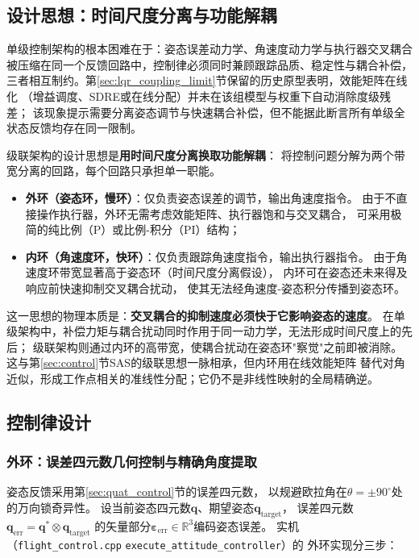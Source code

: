 \subsection{设计思想：时间尺度分离与功能解耦}
\label{sec:cascade_philosophy}

单级控制架构的根本困难在于：姿态误差动力学、角速度动力学与执行器交叉耦合
被压缩在同一个反馈回路中，控制律必须同时兼顾跟踪品质、稳定性与耦合补偿，
三者相互制约。第\ref{sec:lqr_coupling_limit}节保留的历史原型表明，效能矩阵在线化
（增益调度、SDRE或在线分配）并未在该组模型与权重下自动消除度级残差；
该现象提示需要分离姿态调节与快速耦合补偿，但不能据此断言所有单级全状态反馈均存在同一限制。

级联架构的设计思想是\textbf{用时间尺度分离换取功能解耦}：
将控制问题分解为两个带宽分离的回路，每个回路只承担单一职能。

\begin{itemize}
    \item \textbf{外环（姿态环，慢环）}：仅负责姿态误差的调节，输出角速度指令。
          由于不直接操作执行器，外环无需考虑效能矩阵、执行器饱和与交叉耦合，
          可采用极简的纯比例（P）或比例-积分（PI）结构；
    \item \textbf{内环（角速度环，快环）}：仅负责跟踪角速度指令，输出执行器指令。
          由于角速度环带宽显著高于姿态环（时间尺度分离假设），
          内环可在姿态还未来得及响应前快速抑制交叉耦合扰动，
          使其无法经角速度-姿态积分传播到姿态环。
\end{itemize}

这一思想的物理本质是：\textbf{交叉耦合的抑制速度必须快于它影响姿态的速度}。
在单级架构中，补偿力矩与耦合扰动同时作用于同一动力学，无法形成时间尺度上的先后；
级联架构则通过内环的高带宽，使耦合扰动在姿态环"察觉"之前即被消除。
这与第\ref{sec:control}节SAS的级联思想一脉相承，但内环用在线效能矩阵
替代对角近似，形成工作点相关的准线性分配；它仍不是非线性映射的全局精确逆。

\subsection{控制律设计}
\label{sec:cascade_design}

\subsubsection{外环：误差四元数几何控制与精确角度提取}

姿态反馈采用第\ref{sec:quat_control}节的误差四元数，
以规避欧拉角在$\theta=\pm90^\circ$处的万向锁奇异性。
设当前姿态四元数$\mathbf{q}$、期望姿态$\mathbf{q}_{\mathrm{target}}$，
误差四元数$\mathbf{q}_{\mathrm{err}}=\mathbf{q}^{*}\otimes\mathbf{q}_{\mathrm{target}}$
的矢量部分$\boldsymbol{\varepsilon}_{\mathrm{err}}\in\mathbb{R}^3$编码姿态误差。
实机（\texttt{flight\_control.cpp} \texttt{execute\_attitude\_controller}）的
外环实现分三步：


